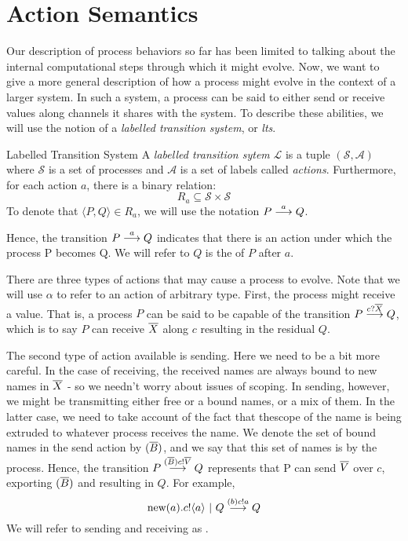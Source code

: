 \section{Action Semantics}
Our description of process behaviors so far has been limited to talking about the internal computational steps through which it might evolve.  
Now, we want to give a more general description of how a process might evolve in the context of a larger system.  
In such a system, a process can be said to either send or receive values along channels it shares with the system.  
To describe these abilities, we will use the notion of a \emph{labelled transition system}, or \emph{lts}.

\begin{definition}{Labelled Transition System}
	A \emph{labelled transition sytem} $\mathcal{L}$ is a tuple $(\mathcal{S}, \mathcal{A})$ 
where $\mathcal{S}$ is a set of processes and $\mathcal{A}$ is a set of labels called \emph{actions}.  
Furthermore, for each action $a$, there is a binary relation:
	\[
		R_a \subseteq \mathcal{S} \times \mathcal{S}
	\]
	To denote that $\langle P,Q\rangle \in R_a$, we will use the notation $P \overset{{a}}{\longrightarrow} Q$.
\end{definition}
Hence, the transition $P \overset{{a}}{\longrightarrow} Q$ indicates that there is an action under which the process P becomes Q.  
We will refer to $Q$ is the  of $P$ after $a$.

There are three types of actions that may cause a process to evolve.  
Note that we will use $\alpha$ to refer to an action of arbitrary type.  
First, the process might receive a value.  
That is, a process $P$ can be said to be capable of the transition $P \overset{{{c}?{\overline{X}}}}{\longrightarrow} Q$, which is to say $P$ can receive $\overline{X}$ along $c$ resulting in the residual $Q$.

The second type of action available is sending.  
Here we need to be a bit more careful.  
In the case of receiving, the received names are always bound to new names in $\overline{X}$ - so we needn't worry about issues of scoping.  
In sending, however, we might be transmitting either free or a bound names, or a mix of them.  
In the latter case, we need to take account of the fact that thescope of the name is being extruded to whatever process receives the name.  
We denote the set of bound names in the send action by $({\overline{B}})$, and we say that this set of names is  by the process.  
Hence, the transition $P \overset{{({\overline{B}}){c}!{\overline{V}}}}{\longrightarrow} Q$ represents that P can send $\overline{V}$ over $c$, exporting $({\overline{B}})$ and resulting in $Q$.  
For example,
\[
	\text{new}({a}).{c}!\langle{a}\rangle \ |\  Q \overset{{({b}){c}!{a}}}{\longrightarrow} Q
\]
We will refer to sending and receiving as .

